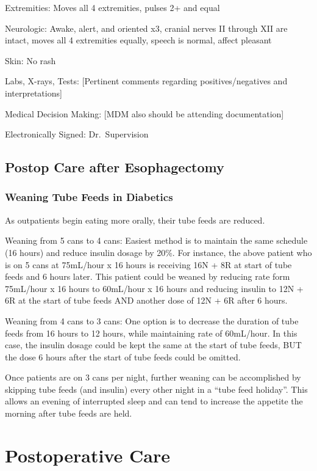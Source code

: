 \documentclass[
]{book}
\begin{document}
Extremities: Moves all 4 extremities, pulses 2+ and equal

Neurologic: Awake, alert, and oriented x3, cranial nerves II through XII are intact, moves all 4 extremities equally, speech is normal, affect pleasant

Skin: No rash

Labs, X-rays, Tests: {[}Pertinent comments regarding positives/negatives and interpretations{]}

Medical Decision Making: {[}MDM also should be attending documentation{]}

Electronically Signed: Dr.~Supervision

\hypertarget{mie_postop}{%
\chapter{Postop Care after Esophagectomy}\label{mie_postop}}

\hypertarget{weaning-tube-feeds-in-diabetics}{%
\section{Weaning Tube Feeds in Diabetics}\label{weaning-tube-feeds-in-diabetics}}

As outpatients begin eating more orally, their tube feeds are reduced.

Weaning from 5 cans to 4 cans: Easiest method is to maintain the same schedule (16 hours) and reduce insulin dosage by 20\%. For instance, the above patient who is on 5 cans at 75mL/hour x 16 hours is receiving 16N + 8R at start of tube feeds and 6 hours later. This patient could be weaned by reducing rate form 75mL/hour x 16 hours to 60mL/hour x 16 hours and reducing insulin to 12N + 6R at the start of tube feeds AND another dose of 12N + 6R after 6 hours.

Weaning from 4 cans to 3 cans: One option is to decrease the duration of tube feeds from 16 hours to 12 hours, while maintaining rate of 60mL/hour. In this case, the insulin dosage could be kept the same at the start of tube feeds, BUT the dose 6 hours after the start of tube feeds could be omitted.

Once patients are on 3 cans per night, further weaning can be accomplished by skipping tube feeds (and insulin) every other night in a ``tube feed holiday''. This allows an evening of interrupted sleep and can tend to increase the appetite the morning after tube feeds are held.

\hypertarget{part-postoperative-care}{%
\part*{Postoperative Care}\label{part-postoperative-care}}
\end{document}
